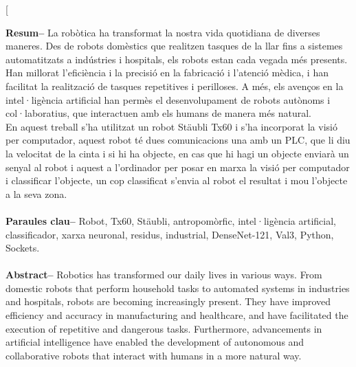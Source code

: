 ﻿\documentclass[10pt,a4paper,twocolumn,twoside]{article}
\begin{document}
\twocolumn[\begin{@twocolumnfalse}


\maketitle

\thispagestyle{primerapagina}
\begin{center}
\parbox{0.915\textwidth}
{\sffamily
\textbf{Resum--}
La robòtica ha transformat la nostra vida quotidiana de diverses maneres. Des de robots domèstics que realitzen tasques de la llar fins a sistemes automatitzats a indústries i hospitals, els robots estan cada vegada més presents. Han millorat l'eficiència i la precisió en la fabricació i l'atenció mèdica, i han facilitat la realització de tasques repetitives i perilloses. A més, els avenços en la intel·ligència artificial han permès el desenvolupament de robots autònoms i col·laboratius, que interactuen amb els humans de manera més natural. \\
En aquest treball s'ha utilitzat un robot Stäubli Tx60 i s'ha incorporat la visió per computador, aquest robot té dues comunicacions una amb un PLC, que li diu la velocitat de la cinta i si hi ha objecte, en cas que hi hagi un objecte enviarà un senyal al robot i aquest a l'ordinador per posar en marxa la visió per computador i classificar l'objecte, un cop classificat s'envia al robot el resultat i mou l'objecte a la seva zona.
\\
\\
\textbf{Paraules clau-- } Robot, Tx60, Stäubli, antropomòrfic, intel·ligència artificial, classificador, xarxa neuronal, residus, industrial, DenseNet-121, Val3, Python, Sockets.
\\
\bigskip
\\
\textbf{Abstract--} Robotics has transformed our daily lives in various ways. From domestic robots that perform household tasks to automated systems in industries and hospitals, robots are becoming increasingly present. They have improved efficiency and accuracy in manufacturing and healthcare, and have facilitated the execution of repetitive and dangerous tasks. Furthermore, advancements in artificial intelligence have enabled the development of autonomous and collaborative robots that interact with humans in a more natural way. \\
}
\end{center}
\end{@twocolumnfalse}
\end{document}
